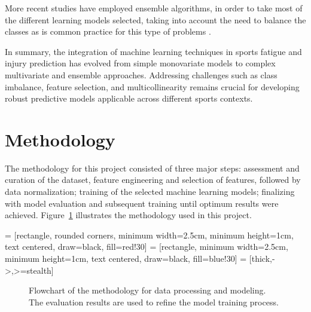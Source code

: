 \documentclass[conference]{IEEEtran}
\begin{document}
More recent studies have employed ensemble algorithms, in order to take most of the different learning models selected, taking into account the need to balance the classes as is common practice for this type of problems \cite{lopez2018preventive}. 

In summary, the integration of machine learning techniques in sports fatigue and injury prediction has evolved from simple monovariate models to complex multivariate and ensemble approaches. Addressing challenges such as class imbalance, feature selection, and multicollinearity remains crucial for developing robust predictive models applicable across different sports contexts.

\section{Methodology}

The methodology for this project consisted of three major steps: assessment and curation of the dataset, feature engineering and selection of features, followed by data normalization; training of the selected machine learning models; finalizing with model evaluation and subsequent training until optimum results were achieved. Figure~\ref{fig:methodology} illustrates the methodology used in this project.

 = [rectangle, rounded corners, minimum width=2.5cm, minimum height=1cm, text centered, draw=black, fill=red!30]
 = [rectangle, minimum width=2.5cm, minimum height=1cm, text centered, draw=black, fill=blue!30]
 = [thick,->,>=stealth]

\begin{figure}[h]
\centering
{}
\caption{Flowchart of the methodology for data processing and modeling. The evaluation results are used to refine the model training process.}
\label{fig:methodology}
\end{figure}
\end{document}
